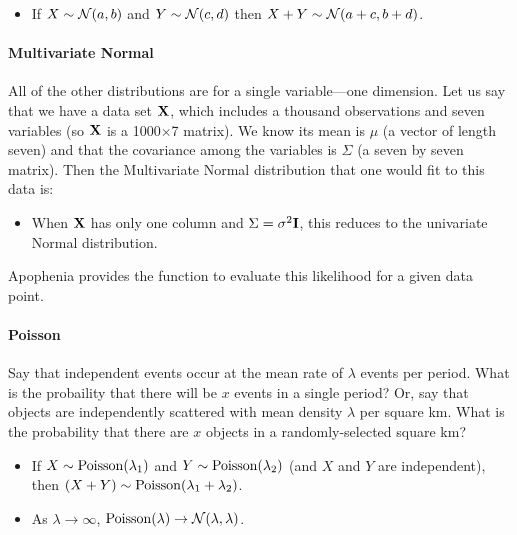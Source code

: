 \begin{itemize}
\item If $X \sim {\cal N} (a,b)$ and $Y \sim {\cal N} (c,d)$ then $X+Y \sim {\cal N}
(a+c,b+d)$.
\end{itemize}

\paragraph{Multivariate Normal}
All of the other distributions are for a single variable---one
dimension. Let us say that we have a data set ${\bf X}$, which includes a
thousand observations and seven variables (so ${\bf X}$ is a 1000$\times$7
matrix). We know its mean is
$\mu$ (a vector of length seven) and that the covariance among the
variables is $\Sigma$ (a seven by seven matrix). Then the Multivariate
Normal distribution that one would fit to this data is:


\begin{itemize}
\item When ${\bf X}$ has only one column and $\Sigma = \sigma^2{\bf I}$,
this reduces to the univariate Normal distribution.
\end{itemize}

Apophenia provides the function 
to evaluate this likelihood for a given data point.

\paragraph{Poisson}

Say that independent events occur at the mean rate of $\lambda$ events per 
period. What is the probaility that there will be $x$ events in a single 
period? Or, say that  objects are independently scattered
with mean density $\lambda$ per square km. What is the probability that
there are $x$ objects in a randomly-selected square km?

\begin{itemize}
\item If $X \sim {\rm Poisson}(\lambda_1)$ and $Y \sim {\rm
Poisson}(\lambda_2)$ (and $X$ and $Y$ are independent), then $(X + Y) \sim {\rm Poisson}(\lambda_1 +
\lambda_2)$.  \item As $\lambda\to\infty$,  ${\rm Poisson}(\lambda)
\to {\cal N}(\lambda, \lambda)$.  \end{itemize}

